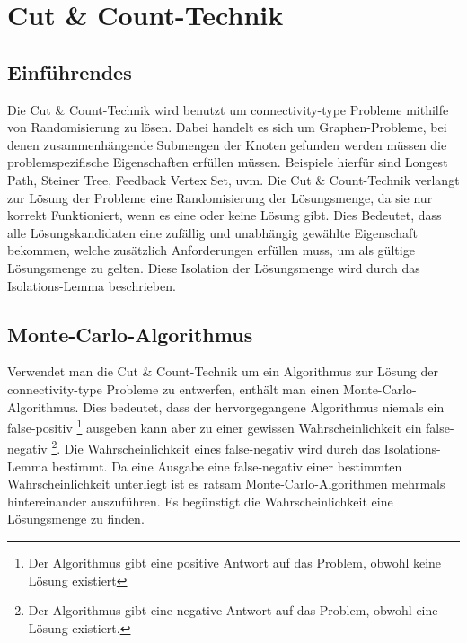 %
%
%
\chapter{Cut \& Count-Technik}
\label{c:cc_general} %


\section{Einführendes}
\label{sec:1}
Die Cut \& Count-Technik wird benutzt um connectivity-type Probleme mithilfe von Randomisierung zu lösen. Dabei handelt es sich um Graphen-Probleme, bei denen zusammenhängende Submengen der Knoten gefunden werden müssen die problemspezifische  Eigenschaften erfüllen müssen. Beispiele hierfür sind Longest Path, Steiner Tree, Feedback Vertex Set, uvm.
Die Cut \& Count-Technik verlangt zur Lösung der Probleme eine Randomisierung der Lösungsmenge, da sie nur korrekt Funktioniert, wenn es eine oder keine Lösung gibt. Dies Bedeutet, dass alle Lösungskandidaten eine zufällig und unabhängig gewählte Eigenschaft bekommen, welche zusätzlich Anforderungen erfüllen muss, um als gültige Lösungsmenge zu gelten. Diese Isolation der Lösungsmenge wird durch das Isolations-Lemma beschrieben.

\section{Monte-Carlo-Algorithmus}
\label{sec:2}

Verwendet man die Cut \& Count-Technik um ein Algorithmus zur Lösung der connectivity-type Probleme zu entwerfen, enthält man einen Monte-Carlo-Algorithmus. Dies bedeutet, dass der hervorgegangene Algorithmus niemals ein false-positiv \footnote{Der Algorithmus gibt eine positive Antwort auf das Problem, obwohl keine Lösung existiert} ausgeben kann aber zu einer gewissen Wahrscheinlichkeit ein false-negativ \footnote{Der Algorithmus gibt eine negative Antwort auf das Problem, obwohl eine Lösung existiert.}. Die Wahrscheinlichkeit eines false-negativ wird durch das Isolations-Lemma bestimmt. Da eine Ausgabe eine false-negativ einer bestimmten Wahrscheinlichkeit unterliegt ist es ratsam Monte-Carlo-Algorithmen mehrmals hintereinander auszuführen. Es begünstigt die Wahrscheinlichkeit eine Lösungsmenge zu finden.

